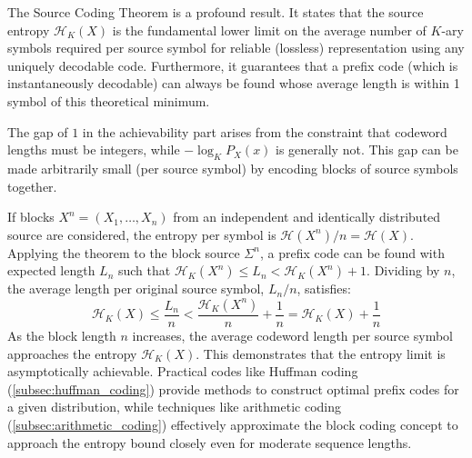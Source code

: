 \noindent The Source Coding Theorem is a profound result. It states that the source entropy $\mathcal{H}_K(X)$ is the fundamental lower limit on the average number of $K$-ary symbols required per source symbol for reliable (lossless) representation using any uniquely decodable code. Furthermore, it guarantees that a prefix code (which is instantaneously decodable) can always be found whose average length is within 1 symbol of this theoretical minimum.

\noindent The gap of $1$ in the achievability part arises from the constraint that codeword lengths must be integers, while $-\log_K P_X(x)$ is generally not. This gap can be made arbitrarily small (per source symbol) by encoding blocks of source symbols together.

If blocks $X^n = (X_1, \ldots, X_n)$ from an independent and identically distributed source are considered, the entropy per symbol is $\mathcal{H}(X^n)/n = \mathcal{H}(X)$. Applying the theorem to the block source $\Sigma^n$, a prefix code can be found with expected length $L_n$ such that $\mathcal{H}_K(X^n) \le L_n < \mathcal{H}_K(X^n) + 1$. Dividing by $n$, the average length per original source symbol, $L_n/n$, satisfies:
\begin{equation*}
    \mathcal{H}_K(X) \le \frac{L_n}{n} < \frac{\mathcal{H}_K(X^n)}{n} + \frac{1}{n} = \mathcal{H}_K(X) + \frac{1}{n}
\end{equation*}
As the block length $n$ increases, the average codeword length per source symbol approaches the entropy $\mathcal{H}_K(X)$. This demonstrates that the entropy limit is asymptotically achievable. Practical codes like Huffman coding (\autoref{subsec:huffman_coding}) provide methods to construct optimal prefix codes for a given distribution, while techniques like arithmetic coding (\autoref{subsec:arithmetic_coding}) effectively approximate the block coding concept to approach the entropy bound closely even for moderate sequence lengths.
